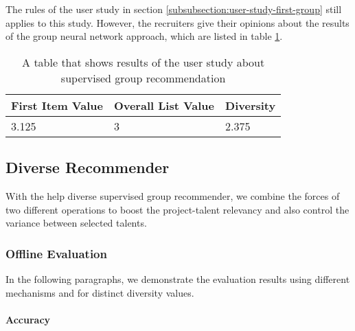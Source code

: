 The rules of the user study in section \ref{subsubsection:user-study-first-group} still applies to this study. However, the recruiters give their opinions about the results of the group neural network approach, which are listed in table \ref{tab:user-study-group-rec-nn}.

\begin{table}[ht]
	\caption[User study group supervised]{A table that shows results of the user study about supervised group recommendation}\label{tab:user-study-group-rec-nn}
	\centering
	\begin{tabular}{l l l}
		\toprule
		First Item Value & Overall List Value & Diversity \\
		\midrule
		3.125 & 3 &  2.375 \\
		\bottomrule
	\end{tabular}
\end{table}


\subsection{Diverse Recommender}

With the help diverse supervised group recommender, we combine the forces of two different operations to boost the project-talent relevancy and also control the variance between selected talents.

\subsubsection{Offline Evaluation}

In the following paragraphs, we demonstrate the evaluation results using different mechanisms and for distinct diversity values.

\paragraph{Accuracy}

